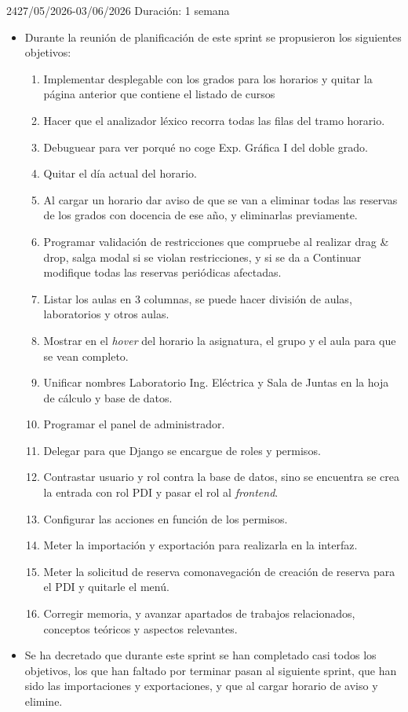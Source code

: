 \begin{Sprint}{24}{27/05/2026-03/06/2026}
	Duración: 1 semana
	\begin{itemize}	
		\item{}
		Durante la reunión de planificación de este sprint se propusieron los siguientes objetivos:
		\begin{enumerate}
			\item Implementar desplegable con los grados para los horarios y quitar la página anterior que contiene el listado de cursos
			\item Hacer que el analizador léxico recorra todas las filas del tramo horario.
			\item Debuguear para ver porqué no coge Exp. Gráfica I del doble grado.
			\item Quitar el día actual del horario.
			\item Al cargar un horario dar aviso de que se van a eliminar todas las reservas de los grados con docencia de ese año, y eliminarlas previamente.
			\item Programar validación de restricciones que compruebe al realizar drag \& drop, salga modal si se violan restricciones, y si se da a Continuar modifique todas las reservas periódicas afectadas.
			\item Listar los aulas en 3 columnas, se puede hacer división de aulas, laboratorios y otros aulas.
			\item Mostrar en el \textit{hover} del horario la asignatura, el grupo y el aula para que se vean completo.
			\item Unificar nombres Laboratorio Ing. Eléctrica y Sala de Juntas en la hoja de cálculo y base de datos.
			\item Programar el panel de administrador.
			\item Delegar para que Django se encargue de roles y permisos.
			\item Contrastar usuario y rol contra la base de datos, sino se encuentra se crea la entrada con rol PDI y pasar el rol al \textit{frontend}.
			\item Configurar las acciones en función de los permisos.
			\item Meter la importación y exportación para realizarla en la interfaz.
			\item Meter la solicitud de reserva comonavegación de creación de reserva para el PDI y quitarle el menú.
			\item Corregir memoria, y avanzar apartados de trabajos relacionados,  conceptos teóricos y aspectos relevantes.
		\end{enumerate}
		\item{}
		Se ha decretado que durante este sprint se han completado casi todos los objetivos, los que han faltado por terminar pasan al siguiente sprint, que han sido las importaciones y exportaciones, y que al cargar horario de aviso y elimine.


\end{itemize}
\end{Sprint}
